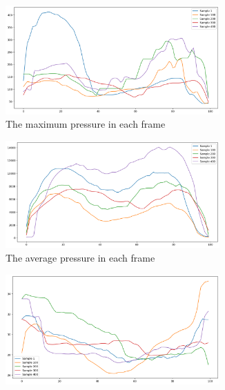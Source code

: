 \begin{figure}
     \centering
     \begin{subfigure}[b]{0.5\textwidth}
         \centering
         \includegraphics[width=0.9\textwidth]{figures/project/df_max.png}
         \caption{The maximum pressure in each frame}
         \label{fig:extracted_features_max}
     \end{subfigure}
     \hfill
     \begin{subfigure}[b]{0.5\textwidth}
         \centering
         \includegraphics[width=0.9\textwidth]{figures/project/df_sum.png}
         \caption{The average pressure in each frame}
         \label{fig:extracted_features_sum}
     \end{subfigure}
     \vfill
     \begin{subfigure}[b]{0.5\textwidth}
         \centering
         \includegraphics[width=0.9\textwidth]{figures/project/df_xCe.png}

\end{subfigure}
\end{figure}
